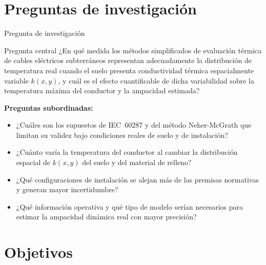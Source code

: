 \documentclass[aspectratio=169]{beamer}
\begin{document}
\section{Preguntas de investigación}

\begin{frame}{Pregunta de investigación}

\begin{block}{Pregunta central}
\justifying
¿En qué medida los métodos simplificados de evaluación térmica de cables
eléctricos subterráneos representan adecuadamente la distribución de
temperatura real cuando el suelo presenta conductividad térmica
espacialmente variable $k(x,y)$, y cuál es el efecto cuantificable
de dicha variabilidad sobre la temperatura máxima del conductor y la
ampacidad estimada?
\end{block}

\vspace{0.7em}
\textbf{Preguntas subordinadas:}
\begin{itemize}[leftmargin=*]\small
    \item ¿Cuáles son los supuestos de IEC~60287 y del método
          Neher-McGrath que limitan su validez bajo condiciones reales
          de suelo y de instalación?
    \item ¿Cuánto varía la temperatura del conductor al cambiar la
          distribución espacial de $k(x,y)$ del suelo y del material
          de relleno?
    \item ¿Qué configuraciones de instalación se alejan más de las
          premisas normativas y generan mayor incertidumbre?
    \item ¿Qué información operativa y qué tipo de modelo serían
          necesarios para estimar la ampacidad dinámica real con mayor
          precisión?
\end{itemize}
\end{frame}


\section{Objetivos}
\end{document}
